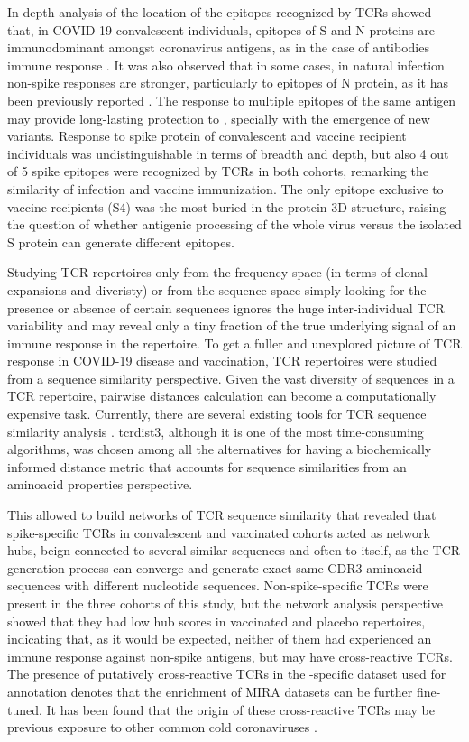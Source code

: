In-depth analysis of the location of the epitopes recognized by TCRs showed that, in COVID-19 convalescent individuals, epitopes of S and N proteins are immunodominant amongst coronavirus antigens, as in the case of antibodies immune response \citep{abepitopes}. It was also observed that in some cases, in natural infection non-spike responses are stronger, particularly to epitopes of N protein, as it has been previously reported \citep{targetstcells, snyder}. The response to multiple epitopes of the same antigen may provide long-lasting protection to \covid, specially with the emergence of new variants. Response to spike protein of convalescent and vaccine recipient individuals was undistinguishable in terms of breadth and depth, but also 4 out of 5 spike epitopes were recognized by TCRs in both cohorts, remarking the similarity of infection and vaccine immunization. The only epitope exclusive to vaccine recipients (S4) was the most buried in the protein 3D structure, raising the question of whether antigenic processing of the whole virus versus the isolated S protein can generate different epitopes.

Studying TCR repertoires only from the frequency space (in terms of clonal expansions and diveristy) or from the sequence space simply looking for the presence or absence of certain sequences ignores the huge inter-individual TCR variability and may reveal only a tiny fraction of the true underlying signal of an immune response in the repertoire. To get a fuller and unexplored picture of TCR response in COVID-19 disease and vaccination, TCR repertoires were studied from a sequence similarity perspective. Given the vast diversity of sequences in a TCR repertoire, pairwise distances calculation can become a computationally expensive task. Currently, there are several existing tools for TCR sequence similarity analysis \citep{gliph2, alice, metaclonotypes}. tcrdist3, although it is one of the most time-consuming algorithms, was chosen among all the alternatives for having a biochemically informed distance metric that accounts for sequence similarities from an aminoacid properties perspective.

This allowed to build networks of TCR sequence similarity that revealed that spike-specific TCRs in convalescent and vaccinated cohorts acted as network hubs, beign connected to several similar sequences and often to itself, as the TCR generation process can converge and generate exact same CDR3 aminoacid sequences with different nucleotide sequences. Non-spike-specific TCRs were present in the three cohorts of this study, but the network analysis perspective showed that they had low hub scores in vaccinated and placebo repertoires, indicating that, as it would be expected, neither of them had experienced an immune response against \covid{} non-spike antigens, but may have cross-reactive TCRs. The presence of putatively cross-reactive TCRs in the \covid-specific dataset used for annotation denotes that the enrichment of MIRA datasets can be further fine-tuned. It has been found that the origin of these cross-reactive TCRs may be previous exposure to other common cold coronaviruses \citep{pfizertcr}.

